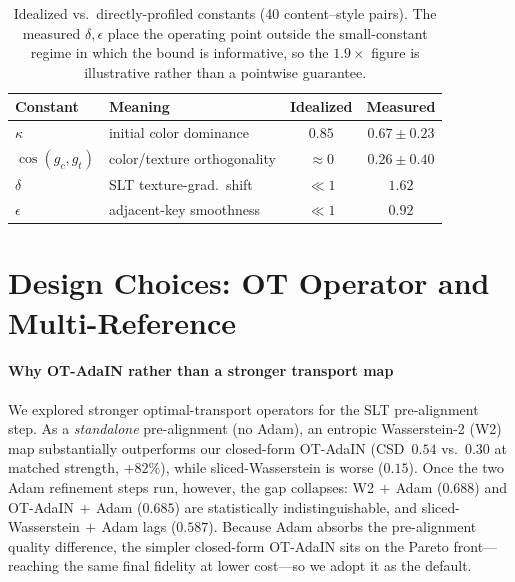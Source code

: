 \begin{table}[h]
  \centering
  \caption{Idealized vs.\ directly-profiled constants (40 content--style pairs).
           The measured $\delta,\epsilon$ place the operating point outside the
           small-constant regime in which the bound is informative, so the
           $1.9\times$ figure is illustrative rather than a pointwise guarantee.}
  \label{tab:measured_constants}
  \footnotesize
  \begin{tabular}{llcc}
    \toprule
    Constant & Meaning & Idealized & Measured \\
    \midrule
    $\kappa$        & initial color dominance     & $0.85$      & $0.67 \pm 0.23$ \\
    $\cos(g_c,g_t)$ & color/texture orthogonality & $\approx 0$ & $0.26 \pm 0.40$ \\
    $\delta$        & SLT texture-grad.\ shift     & $\ll 1$     & $1.62$ \\
    $\epsilon$      & adjacent-key smoothness      & $\ll 1$     & $0.92$ \\
    \bottomrule
  \end{tabular}
\end{table}

\section{Design Choices: OT Operator and Multi-Reference}
\label{app:design_choices}

\paragraph{Why OT-AdaIN rather than a stronger transport map}
We explored stronger optimal-transport operators for the SLT pre-alignment step.
As a \emph{standalone} pre-alignment (no Adam), an entropic Wasserstein-2 (W2)
map substantially outperforms our closed-form OT-AdaIN
(CSD~$0.54$ vs.\ $0.30$ at matched strength, $+82\%$), while sliced-Wasserstein
is worse ($0.15$).
Once the two Adam refinement steps run, however, the gap collapses:
W2$\,+\,$Adam ($0.688$) and OT-AdaIN$\,+\,$Adam ($0.685$) are statistically
indistinguishable, and sliced-Wasserstein$\,+\,$Adam lags ($0.587$).
Because Adam absorbs the pre-alignment quality difference, the simpler
closed-form OT-AdaIN sits on the Pareto front---reaching the same final fidelity
at lower cost---so we adopt it as the default.

